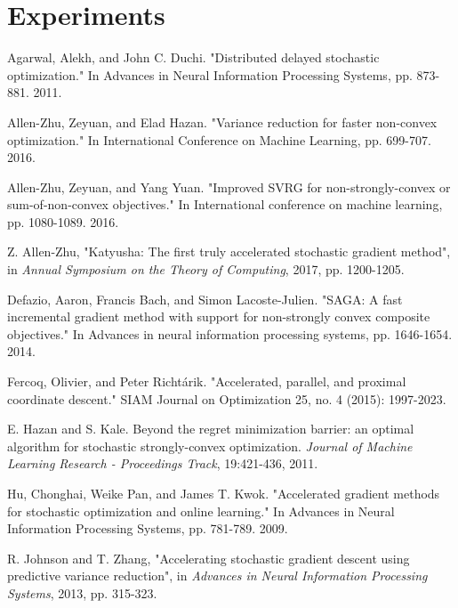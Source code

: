 \documentclass[10pt, conference, compsocconf]{IEEEtran}
\theoremstyle{definition}
\theoremstyle{remark}
\begin{document}
\section{Experiments}
%



\begin{thebibliography}{99}

 Agarwal, Alekh, and John C. Duchi. "Distributed delayed stochastic optimization." In Advances in Neural Information Processing Systems, pp. 873-881. 2011.

  Allen-Zhu, Zeyuan, and Elad Hazan. "Variance reduction for faster non-convex optimization." In International Conference on Machine Learning, pp. 699-707. 2016.

 Allen-Zhu, Zeyuan, and Yang Yuan. "Improved SVRG for non-strongly-convex or sum-of-non-convex objectives." In International conference on machine learning, pp. 1080-1089. 2016.

Z. Allen-Zhu,  "Katyusha: The first truly accelerated stochastic gradient method", in {\it Annual Symposium on the Theory of Computing}, 2017, pp. 1200-1205.

 Defazio, Aaron, Francis Bach, and Simon Lacoste-Julien. "SAGA: A fast incremental gradient method with support for non-strongly convex composite objectives." In Advances in neural information processing systems, pp. 1646-1654. 2014.

 Fercoq, Olivier, and Peter Richtárik. "Accelerated, parallel, and proximal coordinate descent." SIAM Journal on Optimization 25, no. 4 (2015): 1997-2023.

E. Hazan and S. Kale.  Beyond the regret minimization barrier: an optimal algorithm for stochastic strongly-convex optimization. {\it Journal of Machine Learning Research - Proceedings Track}, 19:421-436, 2011.

 Hu, Chonghai, Weike Pan, and James T. Kwok. "Accelerated gradient methods for stochastic optimization and online learning." In Advances in Neural Information Processing Systems, pp. 781-789. 2009.

 R. Johnson and T. Zhang, "Accelerating stochastic gradient descent using predictive variance reduction",
in {\it Advances in Neural Information Processing Systems}, 2013, pp. 315-323.


\end{thebibliography}
\end{document}
